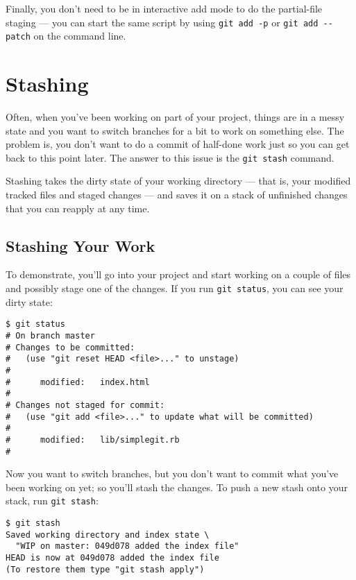 \documentclass[a4paper]{book}
\begin{document}
Finally, you don't need to be in interactive add mode to do the partial-file staging --- you can start the same script by using \texttt{git add -p} or \texttt{git add -{}-patch} on the command line.

\section{Stashing}

Often, when you've been working on part of your project, things are in a messy state and you want to switch branches for a bit to work on something else. The problem is, you don't want to do a commit of half-done work just so you can get back to this point later. The answer to this issue is the \texttt{git stash} command.

Stashing takes the dirty state of your working directory --- that is, your modified tracked files and staged changes --- and saves it on a stack of unfinished changes that you can reapply at any time.

\subsection{Stashing Your Work}

To demonstrate, you'll go into your project and start working on a couple of files and possibly stage one of the changes. If you run \texttt{git status}, you can see your dirty state:

\begin{shaded}\begin{verbatim}
$ git status
# On branch master
# Changes to be committed:
#   (use "git reset HEAD <file>..." to unstage)
#
#      modified:   index.html
#
# Changes not staged for commit:
#   (use "git add <file>..." to update what will be committed)
#
#      modified:   lib/simplegit.rb
#
\end{verbatim}\end{shaded}

Now you want to switch branches, but you don't want to commit what you've been working on yet; so you'll stash the changes. To push a new stash onto your stack, run \texttt{git stash}:

\begin{shaded}\begin{verbatim}
$ git stash
Saved working directory and index state \
  "WIP on master: 049d078 added the index file"
HEAD is now at 049d078 added the index file
(To restore them type "git stash apply")
\end{verbatim}\end{shaded}
\end{document}
